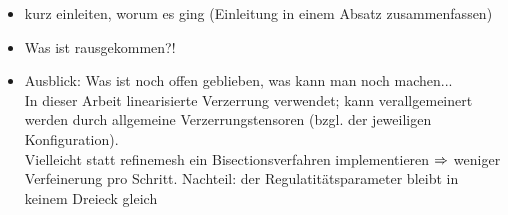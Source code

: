 
\begin{itemize}
\item kurz einleiten, worum es ging (Einleitung in einem Absatz zusammenfassen) 
\item Was ist rausgekommen?!
\item Ausblick: Was ist noch offen geblieben, was kann man noch machen... \\
In dieser Arbeit linearisierte Verzerrung verwendet; kann verallgemeinert werden durch allgemeine Verzerrungstensoren (bzgl. der jeweiligen Konfiguration).\\
Vielleicht statt refinemesh ein Bisectionsverfahren implementieren $\Rightarrow$ weniger Verfeinerung pro Schritt. Nachteil: der Regulatitätsparameter bleibt in keinem Dreieck gleich
\end{itemize}

\newpage

